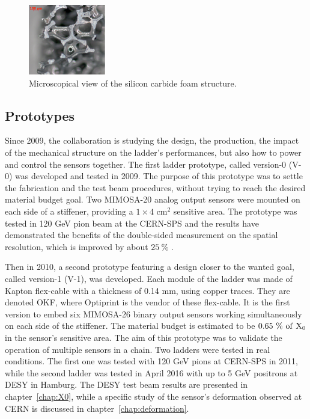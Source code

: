     \begin{figure}[!h]
      \centering
      \includegraphics[width=0.3\textwidth]{Pictures/vxd/foam2.png}
      \caption{Microscopical view of the silicon carbide foam structure.}
      \label{fig:SiC}
    \end{figure}

    \subsection{Prototypes}

    Since 2009, the collaboration is studying the design, the production, the impact of the mechanical structure on the ladder's performances, but also how to power and control the sensors together.
    The first ladder prototype, called version-0 (V-0) was developed and tested in 2009.
    The purpose of this prototype was to settle the fabrication and the test beam procedures, without trying to reach the desired material budget goal.
    Two MIMOSA-20 analog output sensors were mounted on each side of a stiffener, providing a $1 \times 4 \text{ cm}^2$ sensitive area.
    The prototype was tested in 120 GeV pion beam at the CERN-SPS and the results have demonstrated the benefits of the double-sided measurement on the spatial resolution, which is improved by about $25~\%$ \cite{Nomerotski}.

    Then in 2010, a second prototype featuring a design closer to the wanted goal, called version-1 (V-1), was developed.
    Each module of the ladder was made of Kapton flex-cable with a thickness of 0.14 mm, using copper traces.
    They are denoted \gls{OKF}, where Optiprint is the vendor of these flex-cable.
    It is the first version to embed six MIMOSA-26 binary output sensors working simultaneously on each side of the stiffener.
    The material budget is estimated to be $0.65~\% ~\rm{of}~\rm{X_0}$ in the sensor's sensitive area. 
    The aim of this prototype was to validate the operation of multiple sensors in a chain.
    Two ladders were tested in real conditions.
    The first one was tested with 120 GeV pions at CERN-SPS in 2011, while the second ladder was tested in April 2016 with up to 5 GeV positrons at DESY in Hamburg. 
    The DESY test beam results are presented in chapter~\ref{chap:X0}, while a specific study of the sensor's deformation observed at CERN is discussed in chapter~\ref{chap:deformation}.

